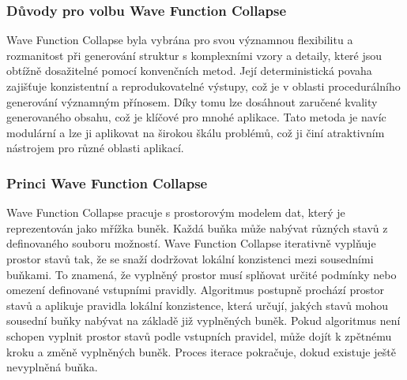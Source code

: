 \subsubsection{Důvody pro volbu Wave Function Collapse}
Wave Function Collapse byla vybrána pro svou významnou flexibilitu a rozmanitost při generování struktur s komplexními vzory a detaily, které jsou obtížně dosažitelné pomocí konvenčních metod. Její deterministická povaha zajišťuje konzistentní a reprodukovatelné výstupy, což je v oblasti procedurálního generování významným přínosem. Díky tomu lze dosáhnout zaručené kvality generovaného obsahu, což je klíčové pro mnohé aplikace. Tato metoda je navíc modulární a lze ji aplikovat na širokou škálu problémů, což ji činí atraktivním nástrojem pro různé oblasti aplikací.

\subsubsection{Princi Wave Function Collapse}
Wave Function Collapse pracuje s prostorovým modelem dat, který je reprezentován jako mřížka buněk. Každá buňka může nabývat různých stavů z definovaného souboru možností. Wave Function Collapse iterativně vyplňuje prostor stavů tak, že se snaží dodržovat lokální konzistenci mezi sousedními buňkami. To znamená, že vyplněný prostor musí splňovat určité podmínky nebo omezení definované vstupními pravidly. Algoritmus postupně prochází prostor stavů a aplikuje pravidla lokální konzistence, která určují, jakých stavů mohou sousední buňky nabývat na základě již vyplněných buněk. Pokud algoritmus není schopen vyplnit prostor stavů podle vstupních pravidel, může dojít k zpětnému kroku a změně vyplněných buněk. Proces iterace pokračuje, dokud existuje ještě nevyplněná buňka.

